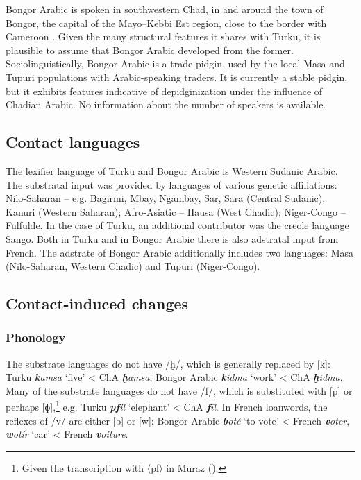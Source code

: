 \documentclass[output=paper]{langsci/langscibook}
\begin{document}
Bongor Arabic is spoken in southwestern Chad, in and around the town of Bongor, the capital of the Mayo--Kebbi Est region, close to the border with Cameroon \citep{Luffin2013}. Given the many structural features it shares with Turku, it is plausible to assume that Bongor Arabic developed from the former. Sociolinguistically, Bongor Arabic is a trade pidgin, used by the local Masa and Tupuri populations with Arabic-speaking traders. It is currently a stable pidgin, but it exhibits features indicative of depidginization under the influence of Chadian Arabic. No information about the number of speakers is available.


 
 \subsection{Contact languages}


The lexifier language of Turku and Bongor Arabic is Western Sudanic Arabic. The substratal input was provided by languages of various genetic affiliations: Nilo-Saharan – e.g. Bagirmi, Mbay, Ngambay, Sar, Sara (Central Sudanic), Kanuri (Western Saharan); Afro-Asiatic – Hausa (West Chadic); Niger-Congo – Fulfulde. In the case of Turku, an additional contributor was the creole language Sango. Both in Turku and in Bongor Arabic there is also adstratal input from French. The adstrate of Bongor Arabic additionally includes two languages: Masa (Nilo-Saharan, Western Chadic) and Tupuri (Niger-Congo).


 
 \subsection{Contact-induced changes}
 \subsubsection{Phonology}

The substrate languages do not have /ḫ/, which is generally replaced by [k]: Turku \textbf{\textit{k}}\textit{amsa} ‘five’ < ChA \textbf{\textit{ḫ}}\textit{amsa}; Bongor Arabic \textbf{\textit{k}}\textit{ídma} ‘work’ < ChA \textbf{\textit{ḫ}}\textit{idma}. Many of the substrate languages do not have /f/, which is substituted with [p] or perhaps [ɸ],\footnote{Given the transcription with 〈pf〉 in Muraz (\citeyear[168]{Muraz1926}).} e.g. Turku \textit{\textbf{pf}il} ‘elephant’ < ChA \textit{\textbf{f}īl}. In French loanwords, the reflexes of /v/ are either [b] or [w]: Bongor Arabic \textit{\textbf{b}oté} ‘to vote’ < French \textit{\textbf{v}oter}, \textit{\textbf{w}otír} ‘car’ < French \textit{\textbf{v}oiture}.  
\end{document}
